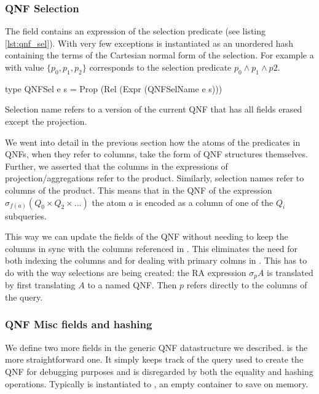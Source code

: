 \subsubsection{QNF Selection}

The  field contains an expression
of the selection predicate (see listing \ref{lst:qnf_sel}). With very few
exceptions  is instantiated as an unordered hash containing the
terms of the Cartesian normal form of the selection. For example a 
with value \(\{p_0, p_1, p_2\}\) corresponds to the selection predicate
\(p_0 \land p_1 \land p2\).

\begin{code}
  \begin{haskellcode}
    type QNFSel e s = Prop (Rel (Expr (QNFSelName e s)))
  \end{haskellcode}
  \caption{\label{lst:qnf_sel}Selection name refers to a version of
    the current QNF that has all fields erased except the projection.}
\end{code}

We went into detail in the previous section how the atoms of the predicates in QNFs,
when they refer to columns, take the form of QNF structures themselves. Further, we asserted
that the columns in the expressions of projection/aggregations refer to the
product. Similarly, selection names refer to columns of the product.
This means that in the QNF of the expression \(\sigma_{f(a)} (Q_0 \times Q_2 \times ...)\)
the atom \(a\) is encoded as a column of one of the \(Q_i\) subqueries.


This way we can update the fields of the QNF without needing to keep
the columns in sync with the columns referenced in . This
eliminates the need for both indexing the columns and for dealing with
primary colmns in . This has to do with the way
selections are being created: the RA expression \(\sigma_p A\) is
translated by first translating \(A\) to a named QNF. Then \(p\)
refers directly to the columns of the query.

\subsubsection{QNF Misc fields and hashing}

We define two more fields in the generic QNF datastructure we
described.  is the more
straightforward one. It simply keeps track of the query used to create
the QNF for debugging purposes and is disregarded by both the equality
and hashing operations. Typically  is
instantiated to , an empty container to save on memory.

